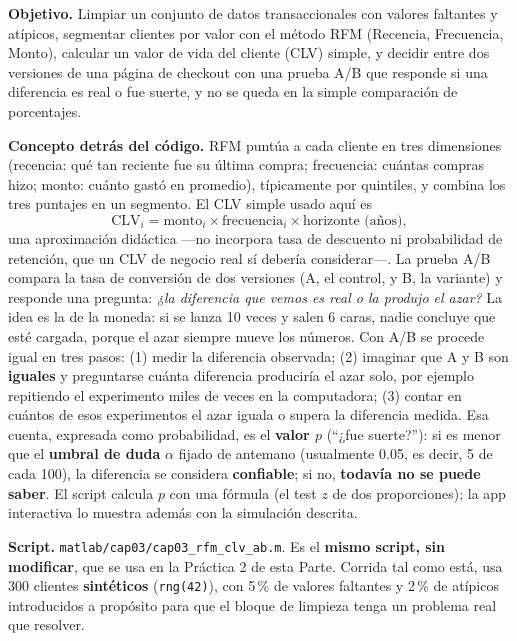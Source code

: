 \begin{cajaLaboratorio}
\textbf{Objetivo.} Limpiar un conjunto de datos transaccionales con valores
faltantes y atípicos, segmentar clientes por valor con el método RFM
(Recencia, Frecuencia, Monto), calcular un valor de vida del cliente (CLV)
simple, y decidir entre dos versiones de una página de checkout con una
prueba A/B que responde si una diferencia es real o fue suerte, y no se
queda en la simple comparación de porcentajes.

\textbf{Concepto detrás del código.} RFM puntúa a cada cliente en tres
dimensiones (recencia: qué tan reciente fue su última compra; frecuencia:
cuántas compras hizo; monto: cuánto gastó en promedio), típicamente por
quintiles, y combina los tres puntajes en un segmento. El CLV simple usado
aquí es
\[
  \mathrm{CLV}_i = \text{monto}_i \times \text{frecuencia}_i \times \text{horizonte (años)},
\]
una aproximación didáctica —no incorpora tasa de descuento ni probabilidad
de retención, que un CLV de negocio real sí debería considerar—. La prueba
A/B compara la tasa de conversión de dos versiones (A, el control, y B, la
variante) y responde una pregunta: \emph{¿la diferencia que vemos es real o la
produjo el azar?} La idea es la de la moneda: si se lanza 10 veces y salen
6 caras, nadie concluye que esté cargada, porque el azar siempre mueve los
números. Con A/B se procede igual en tres pasos: (1) medir la diferencia
observada; (2) imaginar que A y B son \textbf{iguales} y preguntarse cuánta
diferencia produciría el azar solo, por ejemplo repitiendo el experimento miles
de veces en la computadora; (3) contar en cuántos de esos experimentos el azar
iguala o supera la diferencia medida. Esa cuenta, expresada como
probabilidad, es el \textbf{valor $p$} (\enquote{¿fue suerte?}): si es menor
que el \textbf{umbral de duda} $\alpha$ fijado de antemano (usualmente 0.05,
es decir, 5 de cada 100), la diferencia se considera \textbf{confiable}; si no,
\textbf{todavía no se puede saber}. El script calcula $p$ con una fórmula
(el test $z$ de dos proporciones); la app interactiva lo muestra además con
la simulación descrita.

\textbf{Script.} \texttt{matlab/cap03/cap03\_rfm\_clv\_ab.m}. Es el
\textbf{mismo script, sin modificar}, que se usa en la Práctica 2 de esta
Parte. Corrida tal como está, usa 300 clientes \textbf{sintéticos}
(\texttt{rng(42)}), con 5\,\% de valores faltantes y 2\,\% de atípicos
introducidos a propósito para que el bloque de limpieza tenga un problema
real que resolver.


\end{cajaLaboratorio}
